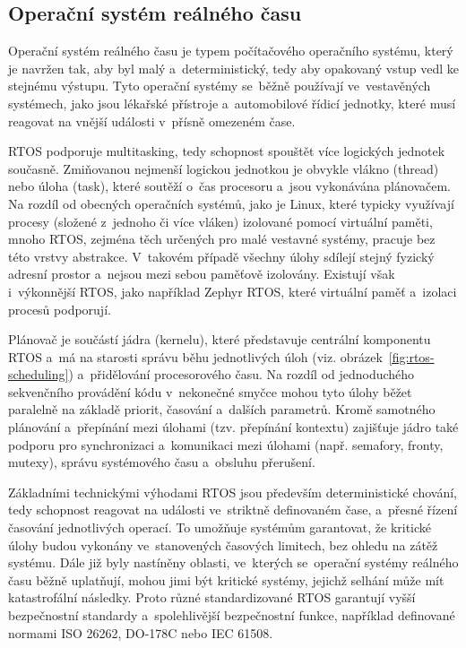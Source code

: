 \subsection{Operační systém reálného času}
Operační systém reálného času je typem počítačového operačního systému, který je navržen tak, aby byl malý a~deterministický, tedy aby opakovaný vstup vedl ke stejnému výstupu. Tyto operační systémy se~běžně používají ve~vestavěných systémech, jako jsou lékařské přístroje a~automobilové řídicí jednotky, které musí reagovat na vnější události v~přísně omezeném čase.~\cite{freertos_what_is_rtos}

RTOS podporuje multitasking, tedy schopnost spouštět více logických jednotek současně. Zmiňovanou nejmenší logickou jednotkou je obvykle vlákno (thread) nebo úloha (task), které soutěží o~čas procesoru a~jsou vykonávána plánovačem. Na rozdíl od obecných operačních systémů, jako je Linux, které typicky využívají procesy (složené z~jednoho či více vláken) izolované pomocí virtuální paměti, mnoho RTOS, zejména těch určených pro malé vestavné systémy, pracuje bez této vrstvy abstrakce. V~takovém případě všechny úlohy sdílejí stejný fyzický adresní prostor a~nejsou mezi sebou paměťově izolovány. Existují však i~výkonnější RTOS, jako například Zephyr RTOS, které virtuální paměť a~izolaci procesů podporují.~\cite{freertos_what_is_rtos}

Plánovač je součástí jádra (kernelu), které představuje centrální komponentu RTOS a~má na starosti správu běhu jednotlivých úloh (viz. obrázek~\ref{fig:rtos-scheduling}) a~přidělování procesorového času. Na rozdíl od jednoduchého sekvenčního provádění kódu v~nekonečné smyčce mohou tyto úlohy běžet paralelně na základě priorit, časování a~dalších parametrů. Kromě samotného plánování a~přepínání mezi úlohami (tzv. přepínání kontextu) zajišťuje jádro také podporu pro synchronizaci a~komunikaci mezi úlohami (např. semafory, fronty, mutexy), správu systémového času a~obsluhu přerušení.~\cite{freertos_book}


Základními technickými výhodami RTOS jsou především deterministické chování, tedy schopnost reagovat na události ve~striktně definovaném čase, a~přesné řízení časování jednotlivých operací. To umožňuje systémům garantovat, že kritické úlohy budou vykonány ve~stanovených časových limitech, bez ohledu na zátěž systému. Dále již byly nastíněny oblasti, ve~kterých se~operační systémy reálného času běžně uplatňují, mohou jimi být kritické systémy, jejichž selhání může mít katastrofální následky. Proto různé standardizované RTOS garantují vyšší bezpečnostní standardy a~spolehlivější bezpečnostní funkce, například definované normami ISO 26262, DO-178C nebo IEC 61508.~\cite{freertos_safertos}

